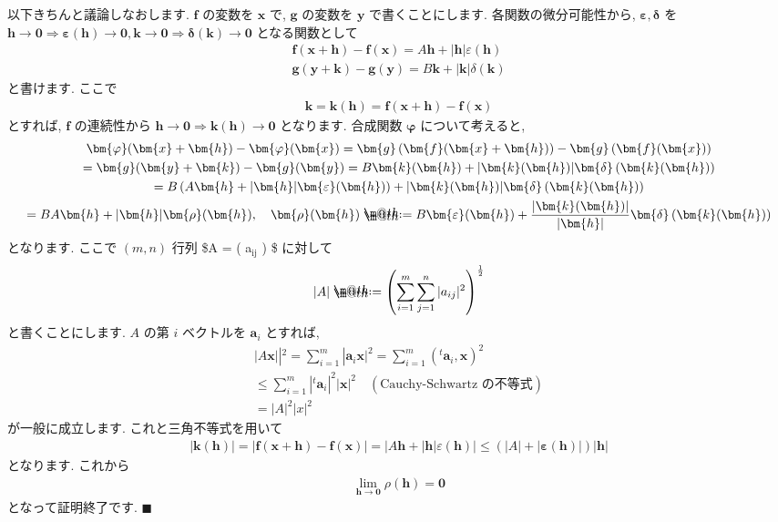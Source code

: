 \documentclass[openany, a4paper, oneside]{book}
\makeatletter
\newcommand*{\defeq}{\mathrel{\rlap{%
\raisebox{0.3ex}{$\m@th\cdot$}}%
\raisebox{-0.3ex}{$\m@th\cdot$}}%
=}
\theoremstyle{break}
\theoremstyle{breakdefn}
\newcommand{\abs}[1]{\left|#1\right|}
\newcommand{\bs}{\blacksquare}
\newcommand{\vep}{\varepsilon}
\makeatother
\begin{document}
以下きちんと議論しなおします.
$\bm{f}$ の変数を $\bm{x}$ で,  $\bm{g}$ の変数を $\bm{y}$ で書くことにします.
各関数の微分可能性から,  $\bm{ \vep}  , \bm{ \delta }$ を
$\bm{h} \to \bm{0} \Rightarrow \bm{\vep}( \bm{h} ) \to \bm{0} , \bm{k} \to \bm{0} \Rightarrow \bm{\delta} ( \bm{k} ) \to \bm{0}$
となる関数として
\begin{gather}
\bm{f} ( \bm{x} + \bm{h} ) - \bm{f} ( \bm{x} )
=
A \bm{h} + | \bm{h} | \vep ( \bm{h} ) \\
\bm{g} ( \bm{y} + \bm{k} ) - \bm{g} ( \bm{y} )
=
B \bm{k} + | \bm{k} | \delta ( \bm{k} )
\end{gather}
と書けます.
ここで
\begin{gather}
\bm{k}
=
\bm{k} ( \bm{h} )
=
\bm{f} ( \bm{x} + \bm{h} ) - \bm{f} ( \bm{x} )
\end{gather}
とすれば,  $\bm{f}$ の連続性から $\bm{h} \to \bm{0} \Rightarrow \bm{k} ( \bm{h} ) \to \bm{0}$ となります.
合成関数 $\bm{ \varphi}$ について考えると,
\begin{gather}
\bm{\varphi} ( \bm{x} + \bm{h} ) - \bm{ \varphi } (\bm{x})
=
\bm{g} \left ( \bm{f} ( \bm{x} + \bm{h} ) \right) - \bm{g} \left ( \bm{f} (\bm{x}) \right) \\
=
\bm{g} ( \bm{y} + \bm{k} ) - \bm{g} ( \bm{y} )
=
B \bm{k} ( \bm{h} ) + | \bm{k} ( \bm{h} ) | \bm{ \delta } \left ( \bm{k} ( \bm{h} ) \right) \\
=
B \left ( A \bm{h} + | \bm{h} | \bm{ \vep } ( \bm{h} ) \right)
+| \bm{k} ( \bm{h} ) | \bm{ \delta } \left ( \bm{k} ( \bm{h} ) \right) \\
=
BA \bm{h} + | \bm{h} | \bm{\rho} ( \bm{h} ), \quad
\bm{ \rho } ( \bm{h} )
\defeq
B \bm{ \vep } ( \bm{h} ) + \frac{ | \bm{k} ( \bm{h} ) | }  { | \bm{h} | } \bm{ \delta } \left ( \bm{k} (\bm{h}) \right)
\end{gather}
となります.
ここで $(m,n)$ 行列 \$A = ( a$_{\mathrm{ij}}$ ) \$ に対して
\begin{gather}
\abs{A}
\defeq
\left ( \sum_{i=1}^{m} \sum_{j=1}^{n} | a_{ij} | ^2 \right)^{ \frac{1} {2} }
\end{gather}
と書くことにします.
$A$ の第 $i$ ベクトルを $\bm{a}_i$ とすれば,
\begin{gather}
\abs{A \bm{x}}|^2
=
\sum_{i=1}^m | \bm{a}_i  \bm{x} |^2
=
\sum_{i=1}^m ( {^t} \bm{a}_i , \bm{x} ) ^2 \\
\leq
\sum_{i=1}^m |{^t} \bm{a}_i |^2 | \bm{x} |^2 \quad ( \text{Cauchy-Schwartz の不等式} ) \\
=
\abs{A}^2 \abs{x}^2
\end{gather}
が一般に成立します.
これと三角不等式を用いて
\begin{gather}
\abs{\bm{k} ( \bm{h} )}
=
\abs{\bm{f} ( \bm{x} + \bm{h} ) - \bm{f} ( \bm{x} )}
=
\abs{A \bm{h} + | \bm{h} | \vep ( \bm{h} )}
\leq
\left ( | A | + | \bm{\vep} ( \bm{h} ) | \right) | \bm{h} |
\end{gather}
となります.
これから
\begin{gather}
\lim_{\bm{h}\to \bm{0}} \rho ( \bm{h} ) = \bm{0}
\end{gather}
となって証明終了です.  $\bs$
\end{document}
